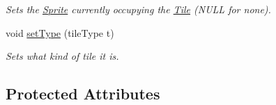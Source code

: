 \begin{DoxyCompactItemize}
\begin{DoxyCompactList}\small\item\em Sets the \hyperlink{class_sprite}{Sprite} currently occupying the \hyperlink{class_tile}{Tile} (N\+U\+LL for none). \end{DoxyCompactList}\item 
void \hyperlink{class_tile_a2557595d030a43cf9b5334df3b7264f7}{set\+Type} (tile\+Type t)\hypertarget{class_tile_a2557595d030a43cf9b5334df3b7264f7}{}\label{class_tile_a2557595d030a43cf9b5334df3b7264f7}

\begin{DoxyCompactList}\small\item\em Sets what kind of tile it is. \end{DoxyCompactList}\end{DoxyCompactItemize}
\subsection*{Protected Attributes}

